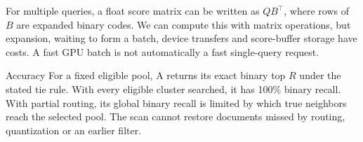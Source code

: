 For multiple queries, a float score matrix can be written as $QB^\top$, where rows of $B$ are
expanded binary codes. We can compute this with matrix operations, but expansion, waiting to form a batch, device
transfers and score-buffer storage have costs. A fast GPU batch is not automatically a fast
single-query request.

\begin{resultbox}{Accuracy}
For a fixed eligible pool, A returns its exact binary top $R$ under the stated tie rule.
With every eligible cluster searched, it has 100\% binary recall. With partial routing,
its global binary recall is limited by which true neighbors reach the selected pool.
The scan cannot restore documents missed by routing, quantization or an earlier filter.
\end{resultbox}
